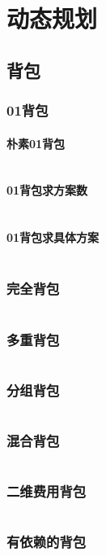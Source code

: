 \documentclass[a4paper,12pt]{article}
\begin{document}
\newpage
\section{动态规划}
\subsection{背包}
\subsubsection{01背包}
\paragraph{朴素01背包}
\inputminted[breaklines, linenos]{c++}{dp/bag/01.cc}
\paragraph{01背包求方案数}
\inputminted[breaklines, linenos]{c++}{dp/bag/sum.cc}
\paragraph{01背包求具体方案}
\inputminted[breaklines, linenos]{c++}{dp/bag/01_way.cc}
\subsubsection{完全背包}
\inputminted[breaklines, linenos]{c++}{dp/bag/comp.cc}
\subsubsection{多重背包}
\inputminted[breaklines, linenos]{c++}{dp/bag/mul.cc}
\subsubsection{分组背包}
\inputminted[breaklines, linenos]{c++}{dp/bag/group.cc}
\subsubsection{混合背包}
\inputminted[breaklines, linenos]{c++}{dp/bag/mix.cc}
\subsubsection{二维费用背包}
\inputminted[breaklines, linenos]{c++}{dp/bag/2di.cc}
\subsubsection{有依赖的背包}
\inputminted[breaklines, linenos]{c++}{dp/bag/dep.cc}
\end{document}
